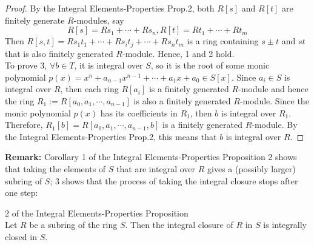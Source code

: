 \begin{proof}
    By the Integral Elements-Properties Prop.2, both $R[s]$ and $R[t]$ are finitely generate $R$-modules, say
    $$R[s]=Rs_1 +\cdots+ Rs_n ,R[t]= Rt_1 +\cdots+ Rt_m$$
    Then $R[s,t]= Rs_1t_1 +\cdots+ Rs_it_j+ \cdots+ Rs_nt_m$ is a ring containing $s\pm t$ and $st$ that is also finitely generated $R$-module. Hence, 1 and 2 hold.\\
    To prove 3, $\forall b\in T$, it is integral over $S$, so it is the root of some monic polynomial $p(x)= x^n +a_{n-1}x^{n-1} +\cdots+ a_1x+a_0 \in S[x]$. Since $a_i \in S$ is integral over $R$, then each ring $R[a_i]$ is a finitely generated $R$-module and hence the ring $R_1:= R[a_0 ,a_1,\cdots, a_{n-1}]$ is also a finitely generated $R$-module. Since the monic polynomial $p(x)$ has its coefficients in $R_1$, then $b$ is integral over $R_1$. Therefore, $R_1 [b] = R[a_0 ,a_1 ,\cdots, a_{n-1},b]$ is a finitely generated $R$-module. By the Integral Elements-Properties Prop.2, this means that $b$ is integral over $R$.
\end{proof}

\noindent\textbf{Remark:} Corollary 1 of the Integral Elements-Properties Proposition 2 shows that taking the elements of $S$ that are integral over $R$ gives a (possibly larger) subring of $S$; 3 shows that the process of taking the integral closure stops after one step:

\begin{corollary}{2 of the Integral Elements-Properties Proposition}\\
Let $R$ be a subring of the ring $S$. Then the integral closure of $R$ in $S$ is integrally closed in $S$.
\end{corollary}

